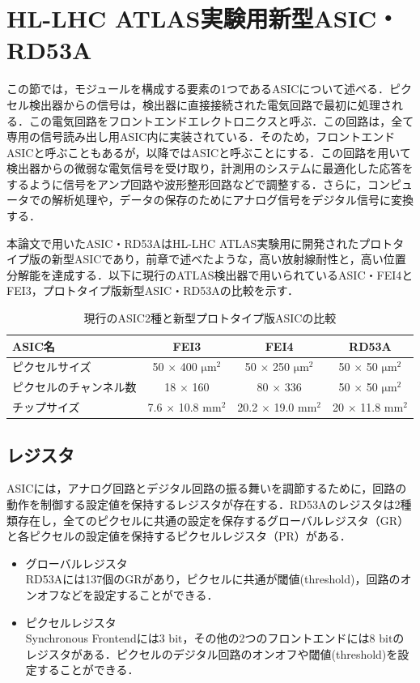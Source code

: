 \section{HL-LHC ATLAS実験用新型ASIC・RD53A}
\label{sec:rd53a}
この節では，モジュールを構成する要素の1つであるASICについて述べる．ピクセル検出器からの信号は，検出器に直接接続された電気回路で最初に処理される．この電気回路をフロントエンドエレクトロニクスと呼ぶ．この回路は，全て専用の信号読み出し用ASIC内に実装されている．そのため，フロントエンドASICと呼ぶこともあるが，以降ではASICと呼ぶことにする．この回路を用いて検出器からの微弱な電気信号を受け取り，計測用のシステムに最適化した応答をするように信号をアンプ回路や波形整形回路などで調整する．さらに，コンピュータでの解析処理や，データの保存のためにアナログ信号をデジタル信号に変換する．\par
本論文で用いたASIC・RD53AはHL-LHC ATLAS実験用に開発されたプロトタイプ版の新型ASICであり，前章で述べたような，高い放射線耐性と，高い位置分解能を達成する．以下に現行のATLAS検出器で用いられているASIC・FEI4とFEI3，プロトタイプ版新型ASIC・RD53Aの比較を示す．

\begin{table}[h]
  \centering
  \caption{現行のASIC2種と新型プロトタイプ版ASICの比較}
  \begin{tabular} {|l|cc|c|} \hline
    ASIC名 & FEI3 & FEI4 & RD53A \\ \hline \hline
    ピクセルサイズ & 50 $\times$ 400 $\mathrm{\mu m^2}$ & 50 $\times$ 250 $\mathrm{\mu m^2}$ & 50 $\times$ 50 $\mathrm{\mu m^2}$ \\
    ピクセルのチャンネル数 & 18 $\times$ 160 & 80 $\times$ 336 & 50 $\times$ 50 $\mathrm{\mu m^2}$ \\ 
    チップサイズ & 7.6 $\times$ 10.8 $\mathrm{mm^2}$ & 20.2 $\times$ 19.0 $\mathrm{mm^2}$ & 20 $\times$ 11.8 $\mathrm{mm^2}$\\ \hline
  \end{tabular}
  \label{tab:ASIC}
\end{table}


\subsection{レジスタ}
ASICには，アナログ回路とデジタル回路の振る舞いを調節するために，回路の動作を制御する設定値を保持するレジスタが存在する．RD53Aのレジスタは2種類存在し，全てのピクセルに共通の設定を保存するグローバルレジスタ（GR）と各ピクセルの設定値を保持するピクセルレジスタ（PR）がある．
\begin{itemize}
\item グローバルレジスタ\\
  RD53Aには137個のGRがあり，ピクセルに共通が閾値(threshold)，回路のオンオフなどを設定することができる．
\item ピクセルレジスタ\\
  Synchronous Frontendには3 $\mathrm{bit}$，その他の2つのフロントエンドには8 $\mathrm{bit}$のレジスタがある．ピクセルのデジタル回路のオンオフや閾値(threshold)を設定することができる．
\end{itemize}


